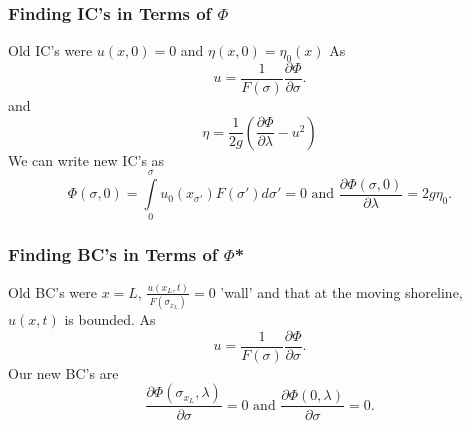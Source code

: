 

\begin{frame}
\frametitle{Finding IC's in Terms of $\Phi$}
Old IC's were $u(x,0) = 0$ and $\eta(x,0) = \eta_0(x)$
As
\[
u = \frac{1}{F(\sigma)} \frac{\partial \Phi}{\partial \sigma}.
\]
and
\[
\eta =  \frac{1}{2g} \left(\frac{\partial \Phi}{\partial \lambda} - u^2 \right)
\]
We can write new IC's as
\[
\Phi(\sigma,0) = \int\limits_0^\sigma u_0(x_{\sigma'})F(\sigma')d\sigma'=0 \text{ and } \frac{\partial \Phi(\sigma,0)}{\partial \lambda} = 2g\eta_0.
\]
\end{frame}


\begin{frame}
\frametitle{Finding BC's in Terms of $\Phi$*}
Old BC's were $x=L$, $\frac{u(x_L,t)}{F(\sigma_{x_L})}=0$ 'wall' and that at the moving shoreline, $u(x,t)$ is bounded. As 
\[
u = \frac{1}{F(\sigma)} \frac{\partial \Phi}{\partial \sigma}.
\]
Our new BC's are
\[
\frac{\partial \Phi(\sigma_{x_L},\lambda)}{\partial \sigma} = 0 \text{ and } \frac{\partial \Phi(0,\lambda)}{\partial \sigma} = 0.
\]
\end{frame}






